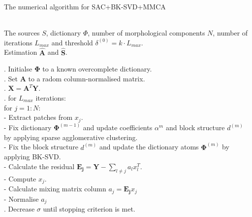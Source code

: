 \begin{algorithm}[!htbp] 
\caption{The numerical algorithm for SAC+BK-SVD+MMCA} 
\label{alg:Framwork} 
\begin{algorithmic}
\REQUIRE ~~\\%
The sources $S$, dictionary $\Phi$, number of morphological components $N$, number of iterations $L_{max}$ and threshold $\delta^{(0)} = k \cdot L_{max}$.
\ENSURE ~~\\ %
Estimation $\hat{\mathbf{A}}$ and $\hat{\mathbf{S}}$.

. Initialse $\mathbf{\Phi}$ to a known overcomplete dictionary.\\
. Set $\mathbf{A}$ to a radom column-normalised matrix.\\
. $\mathbf{X} = \mathbf{A}^T\mathbf{Y}$.\\

. for $L_{max}$ iterations:\\
\quad \quad for $j = 1:N$:\\
\quad \quad \quad - Extract patches from $x_j$.\\
\quad \quad \quad - Fix dictionary $\mathbf{\Phi}^{(m-1)}$ and update coefficients $\alpha^{m}$ and block structure $d^{(m)}$ by applying sparse agglomerative clustering.\\
\quad \quad \quad- Fix the block structure $d^{(m)}$ and update the dictionary atoms $\mathbf{\Phi}^{(m)}$ by applying BK-SVD.\\
\quad \quad \quad - Calculate the residual $\mathbf{E_j} = \mathbf{Y} - \sum_{l\neq j}a_lx_l^T$. \\
\quad \quad \quad - Compute $x_j$. \\
\quad \quad \quad - Calculate mixing matrix column $a_j = \mathbf{E_j}x_j$ \\
\quad \quad \quad - Normalise $a_j$  \\
. Decrease $\sigma$ until stopping criterion is met. \\
\end{algorithmic}
\end{algorithm}


